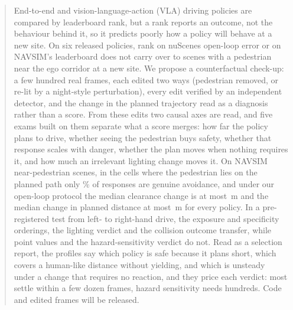 \begin{abstract}
End-to-end and vision-language-action (VLA) driving policies are compared by leaderboard rank, but a rank reports an outcome, not the behaviour behind it, so it predicts poorly how a policy will behave at a new site.
On six released policies, rank on nuScenes open-loop error or on NAVSIM's leaderboard does not carry over to scenes with a pedestrian near the ego corridor at a new site.
We propose a counterfactual check-up: a few hundred real frames, each edited two ways (pedestrian removed, or re-lit by a night-style perturbation), every edit verified by an independent detector, and the change in the planned trajectory read as a diagnosis rather than a score. From these edits two causal axes are read, and five exams built on them separate what a score merges: how far the policy plans to drive, whether seeing the pedestrian buys safety, whether that response scales with danger, whether the plan moves when nothing requires it, and how much an irrelevant lighting change moves it.
On \NumSGscenes{} NAVSIM near-pedestrian scenes, in the cells where the pedestrian lies on the planned path only \NumCfRealPct\% of responses are genuine avoidance, and under our open-loop protocol the median clearance change is at most \NumCfDsHi\,m and the median change in planned distance at most \NumCfArcHi\,m for every policy. In a pre-registered test from left- to right-hand drive, the exposure and specificity orderings, the lighting verdict and the collision outcome transfer, while point values and the hazard-sensitivity verdict do not. Read as a selection report, the profiles say which policy is safe because it plans short, which covers a human-like distance without yielding, and which is unsteady under a change that requires no reaction, and they price each verdict: most settle within a few dozen frames, hazard sensitivity needs hundreds. Code and edited frames will be released.
\end{abstract}
